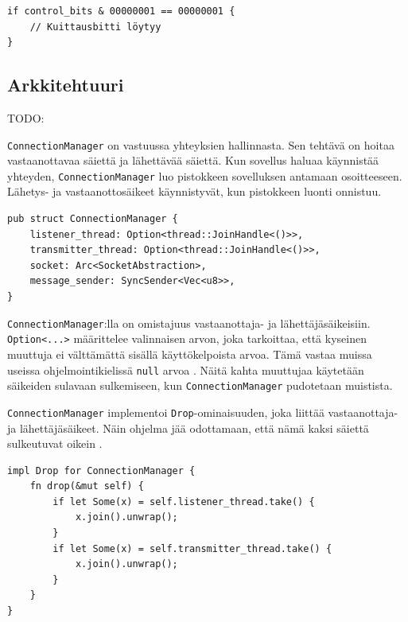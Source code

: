 \documentclass[a4paper,12pt]{article}
\begin{document}
    \begin{lstlisting}[caption={Kuittausbitin tarkistus ohjausbiteistä}, label={lst:ack_check}]
if control_bits & 00000001 == 00000001 {
    // Kuittausbitti löytyy
}\end{lstlisting}

    \subsection{Arkkitehtuuri}\label{sec:arkkitehtuuri}
    TODO: 
    \architecture

    \lstinline{ConnectionManager} on vastuussa yhteyksien hallinnasta. Sen tehtävä on
    hoitaa vastaanottavaa säiettä ja lähettävää säiettä. Kun sovellus haluaa käynnistää yhteyden,
    \lstinline{ConnectionManager} luo pistokkeen sovelluksen antamaan osoitteeseen.
    Lähetys- ja vastaanottosäikeet käynnistyvät, kun pistokkeen luonti onnistuu.
    
    
    \begin{lstlisting}[caption={ConnectionManager:n rakenne}, label={lst:connectionmanager}]
pub struct ConnectionManager {
    listener_thread: Option<thread::JoinHandle<()>>,
    transmitter_thread: Option<thread::JoinHandle<()>>,
    socket: Arc<SocketAbstraction>,
    message_sender: SyncSender<Vec<u8>>,
}\end{lstlisting}

    \lstinline{ConnectionManager}:lla on omistajuus vastaanottaja- ja lähettäjäsäikeisiin.
    \lstinline{Option<...>} määrittelee valinnaisen arvon, joka tarkoittaa, että kyseinen muuttuja ei
    välttämättä sisällä käyttökelpoista arvoa. Tämä vastaa muissa useissa ohjelmointikielissä \lstinline{null} arvoa \cite[luku 6.1]{rust-book}. Näitä kahta muuttujaa käytetään säikeiden sulavaan sulkemiseen, kun \lstinline{ConnectionManager} pudotetaan muistista.

    \lstinline{ConnectionManager} implementoi \lstinline{Drop}-ominaisuuden, joka liittää vastaanottaja-
    ja lähettäjäsäikeet. Näin ohjelma jää odottamaan, että nämä kaksi säiettä sulkeutuvat oikein \cite{rust_doc_joinhandle}.

    \begin{lstlisting}[caption={Drop-ominaisuuden toteutus ConnectionManager:ille}, label={lst:connectionmanager_drop}]
impl Drop for ConnectionManager {
    fn drop(&mut self) {
        if let Some(x) = self.listener_thread.take() {
            x.join().unwrap();
        }
        if let Some(x) = self.transmitter_thread.take() {
            x.join().unwrap();
        }
    }
}\end{lstlisting}
\end{document}
